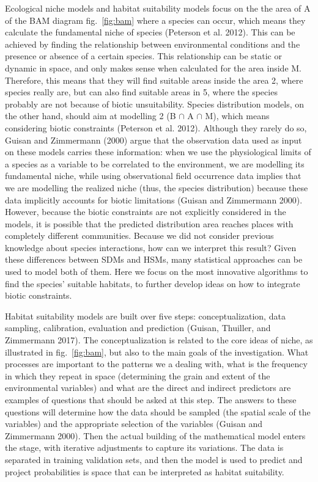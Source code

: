 \documentclass[11pt]{article}
\begin{document}
Ecological niche models and habitat suitability models focus on the the
area of A of the BAM diagram fig.~\ref{fig:bam} where a species can
occur, which means they calculate the fundamental niche of species
(Peterson et al. 2012). This can be achieved by finding the relationship
between environmental conditions and the presence or absence of a
certain species. This relationship can be static or dynamic in space,
and only makes sense when calculated for the area inside M. Therefore,
this means that they will find suitable areas inside the area 2, where
species really are, but can also find suitable areas in 5, where the
species probably are not because of biotic unsuitability. Species
distribution models, on the other hand, should aim at modelling 2 (B
\(\cap\) A \(\cap\) M), which means considering biotic constraints
(Peterson et al. 2012). Although they rarely do so, Guisan and
Zimmermann (2000) argue that the observation data used as input on these
models carries these information: when we use the physiological limits
of a species as a variable to be correlated to the environment, we are
modelling its fundamental niche, while using observational field
occurrence data implies that we are modelling the realized niche (thus,
the species distribution) because these data implicitly accounts for
biotic limitations (Guisan and Zimmermann 2000). However, because the
biotic constraints are not explicitly considered in the models, it is
possible that the predicted distribution area reaches places with
completely different communities. Because we did not consider previous
knowledge about species interactions, how can we interpret this result?
Given these differences between SDMs and HSMs, many statistical
approaches can be used to model both of them. Here we focus on the most
innovative algorithms to find the species' suitable habitats, to further
develop ideas on how to integrate biotic constraints.

Habitat suitability models are built over five steps: conceptualization,
data sampling, calibration, evaluation and prediction (Guisan, Thuiller,
and Zimmermann 2017). The conceptualization is related to the core ideas
of niche, as illustrated in fig.~\ref{fig:bam}, but also to the main
goals of the investigation. What processes are important to the patterns
we a dealing with, what is the frequency in which they repeat in space
(determining the grain and extent of the environmental variables) and
what are the direct and indirect predictors are examples of questions
that should be asked at this step. The answers to these questions will
determine how the data should be sampled (the spatial scale of the
variables) and the appropriate selection of the variables (Guisan and
Zimmermann 2000). Then the actual building of the mathematical model
enters the stage, with iterative adjustments to capture its variations.
The data is separated in training validation sets, and then the model is
used to predict and project probabilities is space that can be
interpreted as habitat suitability.
\end{document}

